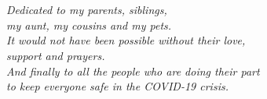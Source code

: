\chapter*{~}

\begin{center}
\textit{Dedicated to my parents, siblings,\\
my aunt, my cousins and my pets. \\
It would not have been possible without their love,\\
support and prayers.\\
And finally to all the people who are
doing their part \\ to keep everyone safe in the COVID-19 crisis. \\[36pt]}
\end{center}